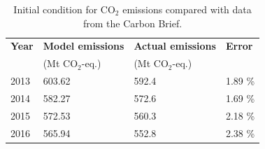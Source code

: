 \begin{table}[H]
	\caption{Initial condition for CO$_2$ emissions compared with data from the Carbon Brief\cite{carbonbrief_carbon_2018}.}
	\vspace{0.1in}
	\begin{tabularx}{\textwidth}{p{} p{} p{} p{}}
		\hline
\textbf{Year} & \textbf{Model emissions} & \textbf{Actual emissions} & \textbf{Error} \\
  & (Mt CO$_2$-eq.) & (Mt CO$_2$-eq.) &  \\
\hline
2013 & 603.62 & 592.4 & 1.89 \% \\
2014 & 582.27 & 572.6 & 1.69 \% \\
2015 & 572.53 & 560.3 & 2.18 \% \\
2016 & 565.94 & 552.8 & 2.38 \% \\
\hline 
	\end{tabularx}
\label{ic-co2}
\end{table}

